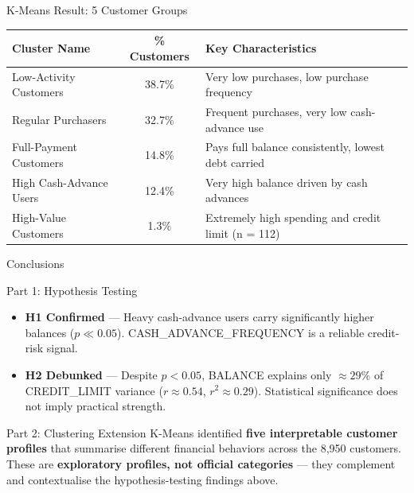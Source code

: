 \documentclass[
  ignorenonframetext,
  aspectratio=169]{beamer}
\begin{document}
\begin{frame}{K-Means Result: 5 Customer Groups}
\protect{}\label{k-means-result-5-customer-groups}
\begin{tabular}{lcl}
\toprule
Cluster Name & \% Customers & Key Characteristics\\
\midrule
Low-Activity Customers & 38.7\% & Very low purchases, low purchase frequency\\
Regular Purchasers & 32.7\% & Frequent purchases, very low cash-advance use\\
Full-Payment Customers & 14.8\% & Pays full balance consistently, lowest debt carried\\
High Cash-Advance Users & 12.4\% & Very high balance driven by cash advances\\
High-Value Customers & 1.3\% & Extremely high spending and credit limit (n = 112)\\
\bottomrule
\end{tabular}
\end{frame}

\begin{frame}{Conclusions}
\protect{}\label{conclusions}
\begin{block}{Part 1: Hypothesis Testing}
\begin{itemize}
  \item \textbf{H1 Confirmed} --- Heavy cash-advance users carry significantly higher balances ($p \ll 0.05$). CASH\_ADVANCE\_FREQUENCY is a reliable credit-risk signal.
  \item \textbf{H2 Debunked} --- Despite $p < 0.05$, BALANCE explains only $\approx 29\%$ of CREDIT\_LIMIT variance ($r \approx 0.54$, $r^2 \approx 0.29$). Statistical significance does not imply practical strength.
\end{itemize}
\end{block}

\vspace{0.3em}

\begin{alertblock}{Part 2: Clustering Extension}
K-Means identified \textbf{five interpretable customer profiles} that summarise
different financial behaviors across the 8,950 customers.
These are \textbf{exploratory profiles, not official categories} ---
they complement and contextualise the hypothesis-testing findings above.
\end{alertblock}
\end{frame}
\end{document}
